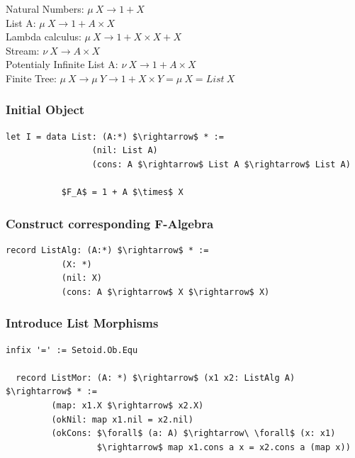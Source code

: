 \documentclass[11pt,oneside]{article}
\begin{document}
\begin{center}
  Natural Numbers: $\mu\ X \rightarrow 1 + X$ \\
  List A: $\mu\ X \rightarrow 1 + A \times X$ \\
  Lambda calculus: $\mu\ X \rightarrow 1 + X \times X + X$ \\
  Stream: $\nu\ X \rightarrow A \times X$ \\
  Potentialy Infinite List A: $\nu\ X \rightarrow 1 + A \times X$ \\
  Finite Tree: $\mu\ X \rightarrow \mu\ Y \rightarrow 1 + X \times Y = \mu\ X = List\ X$ \\
\end{center}

\subsubsection*{Initial Object}

\begin{lstlisting}[mathescape=true]
    let I = data List: (A:*) $\rightarrow$ * :=
                 (nil: List A)
                 (cons: A $\rightarrow$ List A $\rightarrow$ List A)

           $F_A$ = 1 + A $\times$ X
\end{lstlisting}

\subsubsection*{Construct corresponding F-Algebra}

\begin{lstlisting}[mathescape=true]
    record ListAlg: (A:*) $\rightarrow$ * :=
           (X: *)
           (nil: X)
           (cons: A $\rightarrow$ X $\rightarrow$ X)

\end{lstlisting}

\subsubsection*{Introduce List Morphisms}

\begin{lstlisting}[mathescape=true]
  infix '=' := Setoid.Ob.Equ

  record ListMor: (A: *) $\rightarrow$ (x1 x2: ListAlg A) $\rightarrow$ * :=
         (map: x1.X $\rightarrow$ x2.X)
         (okNil: map x1.nil = x2.nil)
         (okCons: $\forall$ (a: A) $\rightarrow\ \forall$ (x: x1)
                  $\rightarrow$ map x1.cons a x = x2.cons a (map x))
\end{lstlisting}
\end{document}
